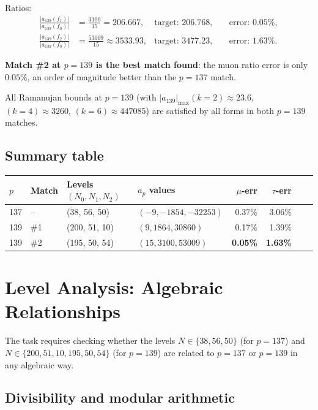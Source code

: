 \documentclass[12pt,a4paper]{article}
\begin{document}
\noindent Ratios:
\begin{align*}
  \frac{|a_{139}(f_1)|}{|a_{139}(f_0)|}
    &= \frac{3100}{15} = 206.667,
    & \text{target: } 206.768,
    & \quad \text{error: } 0.05\%, \\[4pt]
  \frac{|a_{139}(f_2)|}{|a_{139}(f_0)|}
    &= \frac{53009}{15} \approx 3533.93,
    & \text{target: } 3477.23,
    & \quad \text{error: } 1.63\%.
\end{align*}

\noindent\textbf{Match \#2 at $p=139$ is the best match found}: the muon
ratio error is only $0.05\%$, an order of magnitude better than the
$p=137$ match.

All Ramanujan bounds at $p=139$ (with $|a_{139}|_{\max}(k=2) \approx 23.6$,
$(k=4) \approx 3260$, $(k=6) \approx 447085$) are satisfied by all forms
in both $p=139$ matches.

\subsection{Summary table}

\begin{center}
\begin{tabular}{llllrrrr}
\toprule
$p$ & Match & Levels $(N_0,N_1,N_2)$ & $a_p$ values & $\mu$-err & $\tau$-err \\
\midrule
137 & --  & (38, 56, 50)   & $(-9, -1854, -32253)$ & 0.37\% & 3.06\% \\
139 & \#1 & (200, 51, 10)  & $(9, 1864, 30860)$    & 0.17\% & 1.39\% \\
139 & \#2 & (195, 50, 54)  & $(15, 3100, 53009)$   & \textbf{0.05\%} & \textbf{1.63\%} \\
\bottomrule
\end{tabular}
\end{center}

\section{Level Analysis: Algebraic Relationships}

The task requires checking whether the levels $N \in \{38, 56, 50\}$ (for
$p=137$) and $N \in \{200, 51, 10, 195, 50, 54\}$ (for $p=139$) are
related to $p=137$ or $p=139$ in any algebraic way.

\subsection{Divisibility and modular arithmetic}
\end{document}

